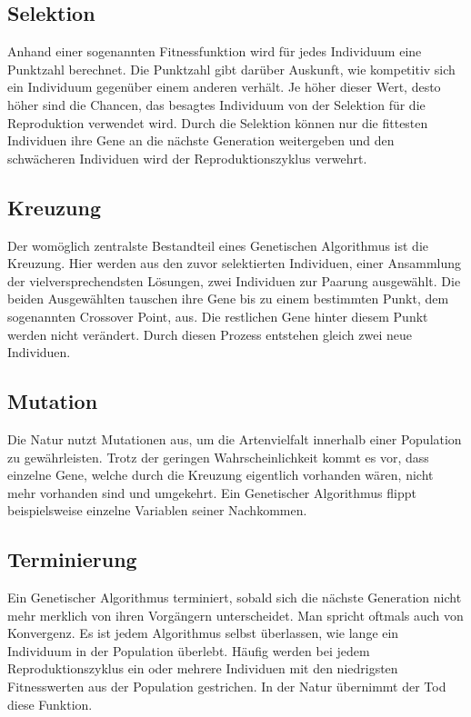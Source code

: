 \subsection{Selektion}
Anhand einer sogenannten Fitnessfunktion wird für jedes Individuum eine Punktzahl berechnet.
Die Punktzahl gibt darüber Auskunft, wie kompetitiv sich ein Individuum gegenüber einem anderen
verhält. Je höher dieser Wert, desto höher sind die Chancen, das besagtes Individuum von der
Selektion für die Reproduktion verwendet wird. Durch die Selektion können nur die fittesten
Individuen ihre Gene an die nächste Generation weitergeben und den schwächeren Individuen wird
der Reproduktionszyklus verwehrt.

\subsection{Kreuzung}
Der womöglich zentralste Bestandteil eines Genetischen Algorithmus ist die Kreuzung. Hier werden
aus den zuvor selektierten Individuen, einer Ansammlung der vielversprechendsten Lösungen, zwei
Individuen zur Paarung ausgewählt. Die beiden Ausgewählten tauschen ihre Gene bis zu einem bestimmten
Punkt, dem sogenannten Crossover Point, aus. Die restlichen Gene hinter diesem Punkt werden nicht
verändert. Durch diesen Prozess entstehen gleich zwei neue Individuen.

\subsection{Mutation}
Die Natur nutzt Mutationen aus, um die Artenvielfalt innerhalb einer Population zu gewährleisten.
Trotz der geringen Wahrscheinlichkeit kommt es vor, dass einzelne Gene, welche durch die Kreuzung
eigentlich vorhanden wären, nicht mehr vorhanden sind und umgekehrt. Ein Genetischer Algorithmus
flippt beispielsweise einzelne Variablen seiner Nachkommen.

\subsection{Terminierung}
Ein Genetischer Algorithmus terminiert, sobald sich die nächste Generation nicht mehr merklich von
ihren Vorgängern unterscheidet. Man spricht oftmals auch von Konvergenz. Es ist jedem Algorithmus
selbst überlassen, wie lange ein Individuum in der Population überlebt. Häufig werden bei jedem
Reproduktionszyklus ein oder mehrere Individuen mit den niedrigsten Fitnesswerten aus der Population
gestrichen. In der Natur übernimmt der Tod diese Funktion.

